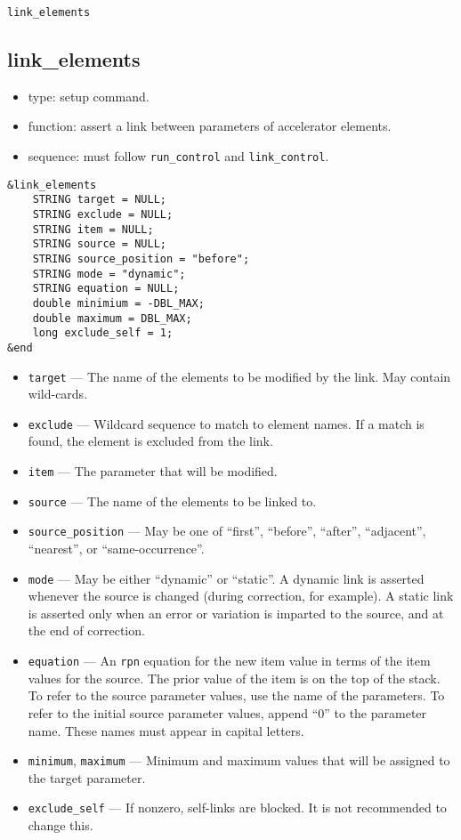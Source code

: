 \documentclass[11pt]{article}
\begin{document}
\newpage
\begin{center}{\Large\verb|link_elements|}\end{center}
\subsection{link\_elements \label{subsec:linkelements}}

\begin{itemize}
\item type: setup command.
\item function: assert a link between parameters of accelerator elements.
\item sequence: must follow \verb|run_control| and \verb|link_control|.
\end{itemize}

\begin{verbatim}
&link_elements
    STRING target = NULL;
    STRING exclude = NULL;
    STRING item = NULL;
    STRING source = NULL;
    STRING source_position = "before";
    STRING mode = "dynamic";
    STRING equation = NULL;
    double minimium = -DBL_MAX;
    double maximum = DBL_MAX;
    long exclude_self = 1;
&end
\end{verbatim}

\begin{itemize}
\item \verb|target| --- The name of the elements to be modified by the link.  May contain
 wild-cards.
\item \verb|exclude| --- Wildcard sequence to match to element names.  If a match is found,
 the element is excluded from the link.
\item \verb|item| --- The parameter that will be modified.
\item \verb|source| --- The name of the elements to be linked to.
\item \verb|source_position| --- May be one of ``first'', ``before'', ``after'', 
``adjacent'', ``nearest'', or ``same-occurrence''.
\item \verb|mode| --- May be either ``dynamic'' or ``static''.  A dynamic link
is asserted whenever the source is changed (during correction, for example).  
A static link is asserted only when an error or variation is imparted to
the source, and at the end of correction.
\item \verb|equation| --- An {\tt rpn} equation for the new item value in
terms of the item values for the source.  The prior value of the item is 
on the top of the stack. To refer to the source
parameter values, use the name of the parameters. To refer to the initial source
parameter values, append ``0'' to the parameter name.  These names must appear
in capital letters.  
\item \verb|minimum|, \verb|maximum| --- Minimum and maximum values that will be
assigned to the target parameter.
\item \verb|exclude_self| --- If nonzero, self-links are blocked. It is not recommended to change this.
\end{itemize}
\end{document}
